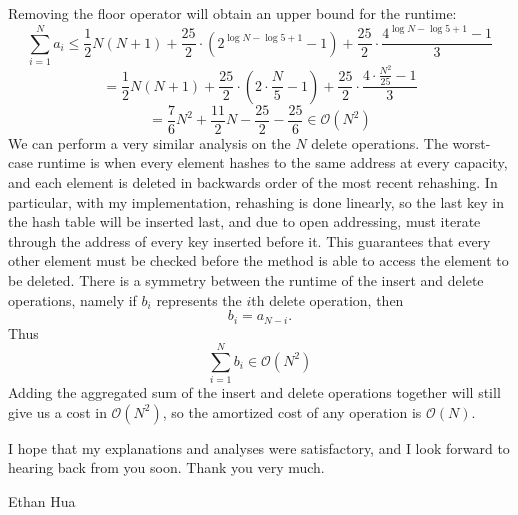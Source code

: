 \documentclass[11pt]{article}
\begin{document}
    Removing the floor operator will obtain an upper bound for the runtime:
    \[
        \sum_{i=1}^{N} a_i \leq \frac{1}{2}N(N+1)+\frac{25}{2} \cdot (2^{\log N - \log 5 + 1} - 1) + \frac{25}{2} \cdot \frac{4^{\log N - \log 5 + 1} - 1}{3}
    \]
    \[
        = \frac{1}{2}N(N+1)+\frac{25}{2} \cdot \left(2 \cdot \frac{N}{5} - 1\right) + \frac{25}{2} \cdot \frac{4 \cdot \frac{N^2}{25} - 1}{3}
    \]
    \[
        = \frac{7}{6}N^2 + \frac{11}{2}N - \frac{25}{2} - \frac{25}{6} \in \mathcal{O} (N^2)
    \]
    We can perform a very similar analysis on the \(N\) delete operations. The worst-case runtime is when every element hashes to the same address at every capacity, and each element is deleted in backwards order of the most recent rehashing. In particular, with my implementation, rehashing is done linearly, so the last key in the hash table will be inserted last, and due to open addressing, must iterate through the address of every key inserted before it. This guarantees that every other element must be checked before the method is able to access the element to be deleted. There is a symmetry between the runtime of the insert and delete operations, namely if \(b_i\) represents the \(i\)th delete operation, then
    \[
        b_i = a_{N-i}.
    \]
    Thus
    \[
        \sum_{i=1}^{N} b_i \in \mathcal{O} (N^2)
    \]
    Adding the aggregated sum of the insert and delete operations together will still give us a cost in \(\mathcal{O} (N^2)\), so the amortized cost of any operation is \(\mathcal{O} (N)\).
    
    I hope that my explanations and analyses were satisfactory, and I look forward to hearing back from you soon. Thank you very much.

    \medskip

    Ethan Hua
\end{document}
